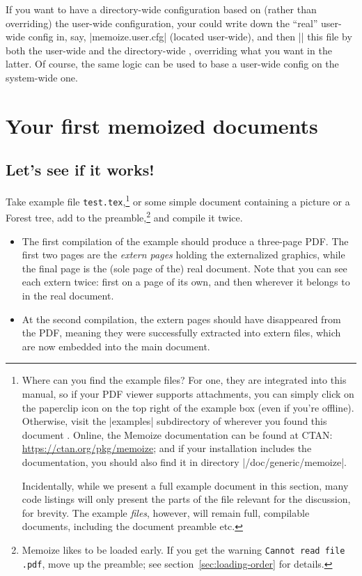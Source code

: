 \documentclass[a4paper,11pt]{article}
\begin{document}
If you want to have a directory-wide configuration based on (rather than
overriding) the user-wide configuration, your could write down the ``real''
user-wide config in, say, |memoize.user.cfg| (located user-wide), and then
|| this file by both the user-wide and the directory-wide
, overriding what you want in the latter.  Of course, the
same logic can be used to base a user-wide config on the system-wide one.

\section{Your first memoized documents}
\label{sec:tut}

\subsection{Let's see if it works!}
\label{sec:tut:test}

%

Take example file \texttt{test.tex},\footnote{Where can you find
  the example files?  For one, they are integrated into this manual, so if your
  PDF viewer supports attachments, you can simply click on the paperclip icon
  on the top right of the example box (even if you're offline).  Otherwise,
  visit the |examples| subdirectory of wherever you found this document
  \Smiley.  Online, the Memoize documentation can be found at CTAN:
  \url{https://ctan.org/pkg/memoize}; and if your  installation
  includes the documentation, you should also find it in directory |/doc/generic/memoize|.
  
  Incidentally, while we present a full example document in this section, many
  code listings will only present the parts of the file relevant for the
  discussion, for brevity.  The example \emph{files}, however, will remain
  full, compilable documents, including the document preamble etc.} or some
simple document containing a \TikZ picture or a Forest tree, add
\EmphVerbatim{\usepackage{memoize}} to the preamble,\footnote{Memoize likes to
  be loaded early.  If you get the warning \texttt{Cannot read file
    .pdf}, move  up the
  preamble; see section~\ref{sec:loading-order} for details.} and compile it
twice.

\begin{itemize}
\item The first compilation of the example should produce a three-page PDF.
  The first two pages are the \emph{extern pages} holding the externalized
  graphics, while the final page is the (sole page of the) real document.  Note
  that you can see each extern twice: first on a page of its own, and then
  wherever it belongs to in the real document.
\item At the second compilation, the extern pages should have disappeared from
  the PDF, meaning they were successfully extracted into extern files, which
  are now embedded into the main document.
\end{itemize}
\end{document}
